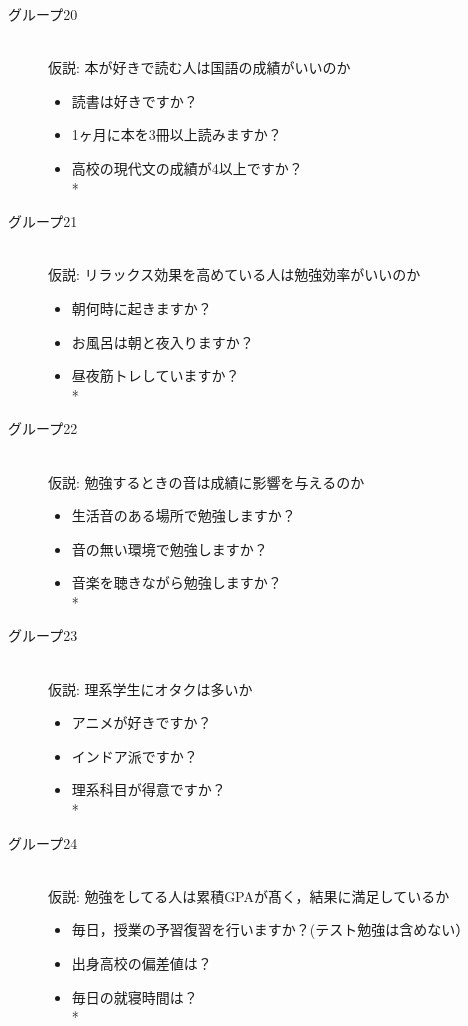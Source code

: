 \begin{description}
 \item[グループ20]\mbox{}\\
 仮説: 本が好きで読む人は国語の成績がいいのか
	    \begin{itemize}
   	\item 読書は好きですか？
   	\item 1ヶ月に本を3冊以上読みますか？
   	\item 高校の現代文の成績が4以上ですか？   \vspace{0.1in} \\*
	\end{itemize}

 \item[グループ21]\mbox{}\\
 仮説: リラックス効果を高めている人は勉強効率がいいのか
	    \begin{itemize}
   	\item 朝何時に起きますか？
   	\item お風呂は朝と夜入りますか？
   	\item 昼夜筋トレしていますか？   \vspace{0.1in} \\*
	\end{itemize}

 \item[グループ22]\mbox{}\\
 仮説: 勉強するときの音は成績に影響を与えるのか
	    \begin{itemize}
   	\item 生活音のある場所で勉強しますか？
   	\item 音の無い環境で勉強しますか？
   	\item 音楽を聴きながら勉強しますか？   \vspace{0.1in} \\*
	\end{itemize}

 \item[グループ23]\mbox{}\\
 仮説: 理系学生にオタクは多いか
	    \begin{itemize}
   	\item アニメが好きですか？
   	\item インドア派ですか？
   	\item 理系科目が得意ですか？   \vspace{0.1in} \\*
	\end{itemize}

 \item[グループ24]\mbox{}\\
 仮説: 勉強をしてる人は累積GPAが髙く，結果に満足しているか
	    \begin{itemize}
   	\item 毎日，授業の予習復習を行いますか？(テスト勉強は含めない）
   	\item 出身高校の偏差値は？
   	\item 毎日の就寝時間は？   \vspace{0.1in} \\*
	\end{itemize}


\end{description}
